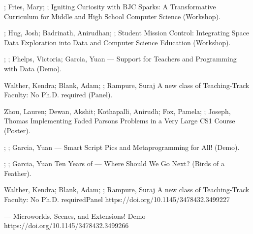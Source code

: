 \begin{etaremune}
    \item{\dan; Fries, Mary; \me; \lauren \newline Igniting Curiosity with BJC Sparks: A Transformative Curriculum for Middle and High School Computer Science (Workshop). }
    
    \item{\dan; Hug, Josh; Badrinath, Anirudhan;  \me; \lauren \newline Student Mission Control: Integrating Space Data Exploration into Data and Computer Science Education (Workshop). }

    \item{\me; \dan; Phelps, Victoria; Garcia, Yuan \newline {} — Support for Teachers and Programming with Data (Demo). }
    
    \item{Walther, Kendra; Blank, Adam; \me; Rampure, Suraj
    \newline A new class of Teaching-Track Faculty: No Ph.D. required (Panel).  }
    
    \item{Zhou, Lauren; Dewan, Akshit; Kothapalli, Anirudh; Fox, Pamela; \me; Joseph, Thomas
    \newline
    Implementing Faded Parsons Problems in a Very Large CS1 Course (Poster). }
    
    \item{\me; \dan; Garcia, Yuan \newline {} — Smart Script Pics and Metaprogramming for All! (Demo). }

    \item{\me; \dan; Garcia, Yuan \newline Ten Years of \snap{} — Where Should We Go Next? (Birds of a Feather). }
    
    \sigcsePVD
        {Walther, Kendra; Blank, Adam; \me; Rampure, Suraj}
        {A new class of Teaching-Track Faculty: No Ph.D. required}{Panel}
        {https://doi.org/10.1145/3478432.3499227}
    
        { — Microworlds, Scenes, and Extensions!}
        {Demo}
        {https://doi.org/10.1145/3478432.3499266} 


\end{etaremune}
